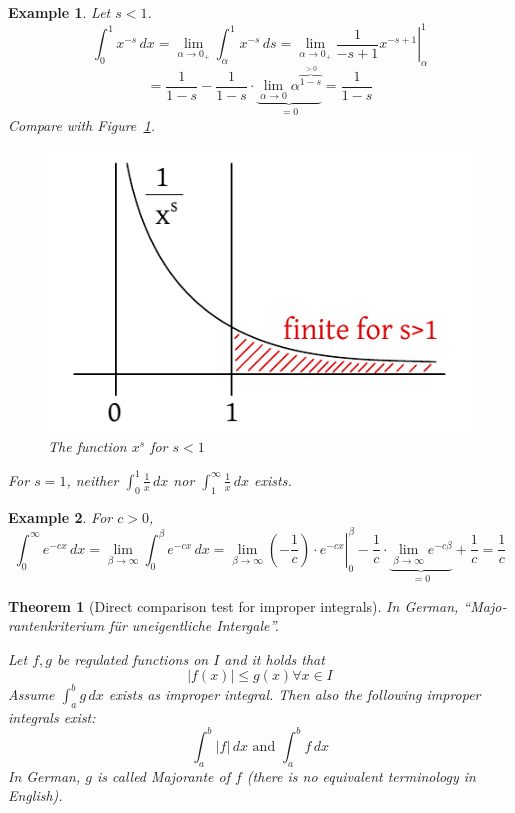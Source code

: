 \documentclass{article}
\newtheorem{theorem}{Theorem}  \numberwithin{theorem}{section}
\newtheorem{example}{Example}  \numberwithin{example}{section}
\newcommand{\card}[1]{\left|#1\right|}
\begin{document}
\begin{example}
  Let $s < 1$.
  \[
    \int_0^1 x^{-s} \, dx = \lim_{\alpha \to 0_+} \int_\alpha^1 x^{-s} \, ds
    = \left. \lim_{\alpha\to 0_+} \frac{1}{-s + 1} x^{-s+1} \right|_\alpha^1
  \] \[
    = \frac1{1 - s} - \frac1{1 - s} \cdot \underbrace{\lim_{\alpha \to 0} \alpha^{\overbrace{1 - s}^{> 0}}}_{= 0} = \frac1{1 - s}
  \]
  Compare with Figure~\ref{img:xs1}.
  \begin{figure}[t]
    \begin{center}
      \includegraphics{img/21b_1_by_xs.pdf}
      \caption{The function ${x^s}$ for $s < 1$}
      \label{img:xs1}
    \end{center}
  \end{figure}

  For $s = 1$, neither $\int_0^1 \frac1x \, dx$ nor $\int_1^\infty \frac1x \, dx$ exists.
\end{example}

\begin{example}
  For $c > 0$,
  \[ \int_0^\infty e^{-cx} \, dx = \lim_{\beta \to \infty} \int_0^\beta e^{-cx} \, dx = \left. \lim_{\beta \to \infty} \left(-\frac1c\right) \cdot e^{-cx} \right|_0^\beta - \frac1c \cdot \underbrace{\lim_{\beta \to \infty} e^{-c\beta}}_{= 0} + \frac1c = \frac1c \]
\end{example}

\begin{theorem}[Direct comparison test for improper integrals] %
  \label{dctii}
  In German, \enquote{\foreignlanguage{german}{Majorantenkriterium f\"ur uneigentliche Intergale}}.

  Let $f, g$ be regulated functions on $I$ and it holds that
  \[ \card{f(x)} \leq g(x) \forall x \in I \]
  Assume $\int_a^b g \, dx$ exists as improper integral. Then also the following improper integrals exist:
  \[ \int_a^b \card{f} \, dx \text{ and } \int_a^b f \, dx \]
  In German, $g$ is called \foreignlanguage{german}{Majorante} of $f$ (there is no equivalent terminology in English).
\end{theorem}
\end{document}
